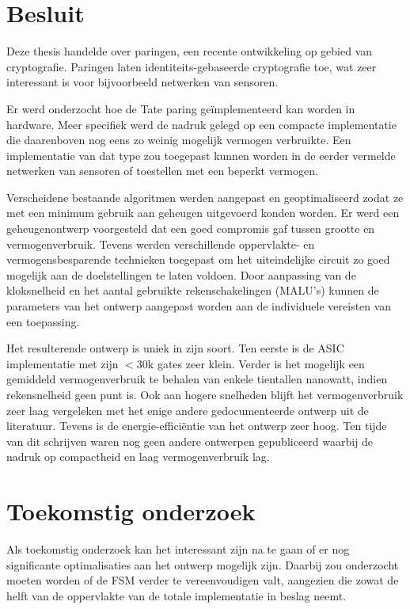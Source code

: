 
\section{Besluit}

Deze thesis handelde over paringen, een recente ontwikkeling op gebied van cryptografie. Paringen laten identiteits-gebaseerde cryptografie toe, wat zeer interessant is voor bijvoorbeeld netwerken van sensoren.

Er werd onderzocht hoe de Tate paring ge\"implementeerd kan worden in hardware. Meer specifiek werd de nadruk gelegd op een compacte implementatie die daarenboven nog eens zo weinig mogelijk vermogen verbruikte. Een implementatie van dat type zou toegepast kunnen worden in de eerder vermelde netwerken van sensoren of toestellen met een beperkt vermogen.

Verscheidene bestaande algoritmen werden aangepast en geoptimaliseerd zodat ze met een minimum gebruik aan geheugen uitgevoerd konden worden. Er werd een geheugenontwerp voorgesteld dat een goed compromis gaf tussen grootte en vermogenverbruik. Tevens werden verschillende oppervlakte- en vermogensbesparende technieken toegepast om het uiteindelijke circuit zo goed mogelijk aan de doelstellingen te laten voldoen. Door aanpassing van de kloksnelheid en het aantal gebruikte rekenschakelingen (MALU's) kunnen de parameters van het ontwerp aangepast worden aan de individuele vereisten van een toepassing.

Het resulterende ontwerp is uniek in zijn soort. Ten eerste is de ASIC implementatie met zijn $<$30k gates zeer klein. Verder is het mogelijk een gemiddeld vermogenverbruik te behalen van enkele tientallen nanowatt, indien rekensnelheid geen punt is. Ook aan hogere snelheden blijft het vermogenverbruik zeer laag vergeleken met het enige andere gedocumenteerde ontwerp uit de literatuur. Tevens is de energie-effici\"entie van het ontwerp zeer hoog. Ten tijde van dit schrijven waren nog geen andere ontwerpen gepubliceerd waarbij de nadruk op compactheid en laag vermogenverbruik lag.

\section{Toekomstig onderzoek}

Als toekomstig onderzoek kan het interessant zijn na te gaan of er nog significante optimalisaties aan het ontwerp mogelijk zijn. Daarbij zou onderzocht moeten worden of de FSM verder te vereenvoudigen valt, aangezien die zowat de helft van de oppervlakte van de totale implementatie in beslag neemt.

